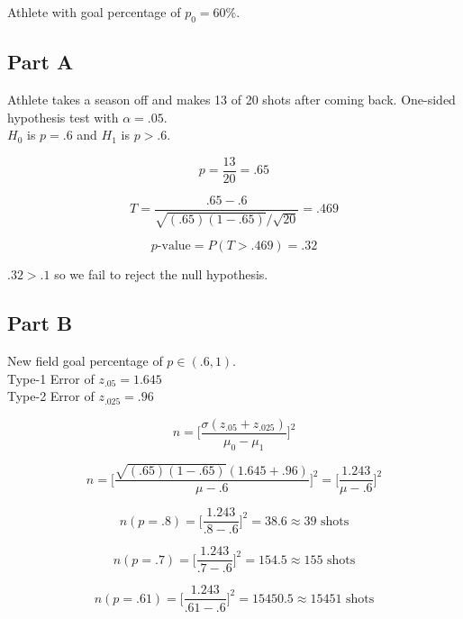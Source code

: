 \documentclass[letterpaper]{article}
\begin{document}
Athlete with goal percentage of $p_0 = 60\%$.

\subsection*{Part A}

Athlete takes a season off and makes 13 of 20 shots after coming back. One-sided hypothesis test with $\alpha = .05$.\\

\noindent $H_0$ is $p = .6$ and $H_1$ is $p > .6$.

$$p = \frac{13}{20} = .65$$

$$T = \frac{.65 - .6}{\sqrt{(.65)(1 - .65)} / \sqrt{20}} = .469$$

$$p\text{-value} = P(T > .469) = .32$$

\noindent $.32 > .1$ so we fail to reject the null hypothesis.

\subsection*{Part B}

New field goal percentage of $p \in (.6, 1)$.\\

\noindent Type-1 Error of $z_{.05} = 1.645$\\

\noindent Type-2 Error of $z_{.025} = .96$

$$n = \Big[ \frac{\sigma (z_{.05} + z_{.025})}{\mu_0 - \mu_1} \Big]^2$$

$$n = \Big[ \frac{\sqrt{(.65)(1 - .65)}(1.645 + .96)}{\mu - .6} \Big]^2 = \Big[ \frac{1.243}{\mu -.6}\Big]^2$$

$$n(p = .8) = \Big[ \frac{1.243}{.8 -.6}\Big]^2 = 38.6 \approx 39 \text{ shots}$$

$$n(p = .7) = \Big[ \frac{1.243}{.7 -.6}\Big]^2 = 154.5 \approx 155 \text{ shots}$$

$$n(p = .61) = \Big[ \frac{1.243}{.61 -.6}\Big]^2 = 15450.5 \approx 15451 \text{ shots}$$
\end{document}
